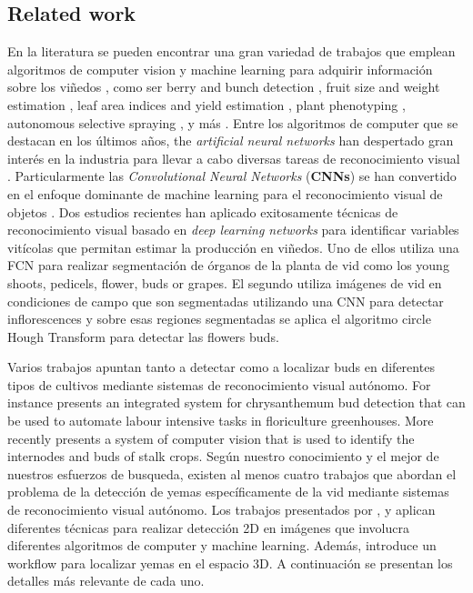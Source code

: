 \documentclass[a4paper,authoryear,review]{elsarticle}
\begin{document}
\subsection{Related work}   \label{sec:related}

En la literatura se pueden encontrar una gran variedad de trabajos que emplean algoritmos de computer vision y machine learning para adquirir información sobre los viñedos \citep{seng2018computer}, como ser berry and bunch detection \citep{nuske2011yield}, fruit size and weight estimation \citep{tardaguila2012automatic}, leaf area indices and yield estimation \citep{diago2012grapevine}, plant phenotyping \citep{herzog2014objective, herzog2014initial}, autonomous selective spraying \citep{berenstein2010grape}, y más \citep{tardaguila2012applications, whalley2013applications}. Entre los algoritmos de computer que se destacan en los últimos años, the \emph{artificial neural networks} han despertado gran interés en la industria para llevar a cabo diversas tareas de reconocimiento visual \citep{hirano2006industry, kahng2017cti, tilgner2019multi}. Particularmente las \emph{Convolutional Neural Networks} (\textbf{CNNs}) se han convertido en el enfoque dominante de machine learning para el reconocimiento visual de objetos \citep{ning2017inception}. Dos estudios recientes han aplicado exitosamente técnicas de reconocimiento visual basado en \emph{deep learning networks} para identificar variables vitícolas que permitan estimar la producción en viñedos. Uno de ellos \citet{grimm2019adaptable} utiliza una FCN para realizar segmentación de órganos de la planta de vid como los young shoots, pedicels, flower, buds or grapes. El segundo \citet{rudolph2018efficient} utiliza imágenes de vid en condiciones de campo que son segmentadas utilizando una CNN para detectar inflorescences y sobre esas regiones segmentadas se aplica el algoritmo circle Hough Transform para detectar las flowers buds.

Varios trabajos apuntan tanto a detectar como a localizar buds en diferentes tipos de cultivos mediante sistemas de reconocimiento visual autónomo. For instance \citet{tarry2014integrated} presents an integrated system for chrysanthemum bud detection that can be used to automate labour intensive tasks in floriculture greenhouses. More recently \citet{zhao2018research} presents a system  of  computer  vision  that is used  to  identify  the  internodes and  buds  of  stalk  crops. Según nuestro conocimiento y el mejor de nuestros esfuerzos de busqueda, existen al menos cuatro trabajos que abordan el problema de la detección de yemas específicamente de la vid mediante sistemas de reconocimiento visual autónomo. Los trabajos presentados por \citet{xu2014detection}, \citet{herzog2014initial} y \citet{perez2017image} aplican diferentes técnicas para realizar detección 2D en imágenes que involucra diferentes algoritmos de computer y machine learning. Además, \citet{diaz2018grapevine} introduce un workflow para localizar yemas en el espacio 3D. A continuación se presentan los detalles más relevante de cada uno.
\end{document}
